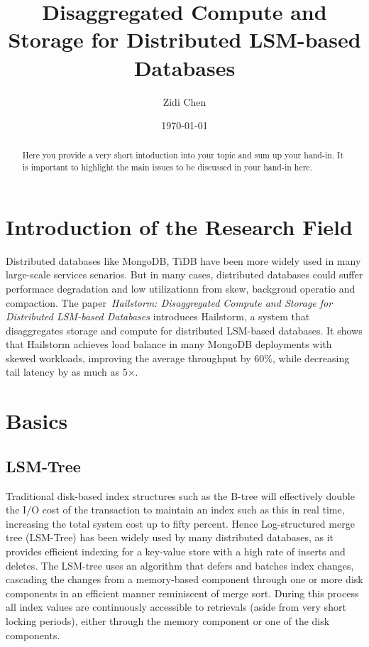 \documentclass[a4paper,10pt,twoside]{article}
\title{Disaggregated Compute and Storage for Distributed LSM-based Databases}
\author{Zidi Chen}
\date{\today}
\begin{document}
\maketitle

\begin{abstract}
Here you provide a very short intoduction into your topic and sum up your hand-in. 
It is important to highlight the main issues to be discussed in your hand-in here.
\end{abstract}

\tableofcontents

\section{Introduction of the Research Field}

Distributed databases like MongoDB, TiDB have been more widely used in many large-scale services senarios.
But in many cases, distributed databases could suffer performace degradation and low utilizationn from skew, backgroud operatio and compaction.
The paper~\textit{Hailstorm: Disaggregated Compute and Storage for Distributed LSM-based Databases} \cite{mainpaper}introduces Hailstorm, a system that disaggregates storage and compute for distributed LSM-based databases.
It shows that Hailstorm achieves load balance in many MongoDB deployments with skewed workloads, improving the average throughput by 60$\%$, while decreasing tail latency by as much as 5×.


\section{Basics}

\subsection{LSM-Tree}

Traditional disk-based index structures such as the B-tree will effectively double the I/O cost of the transaction to maintain an index such as this in real time, increasing the total system cost up to fifty percent. 
Hence Log-structured merge tree (LSM-Tree) has been widely used by many distributed databases, as it provides efficient indexing for a key-value store with a high rate of inserts and deletes.
The LSM-tree uses an algorithm that defers and batches index changes, cascading the changes from a memory-based component through one or more disk components in an efficient manner reminiscent of merge sort. 
During this process all index values are continuously accessible to retrievals (aside from very short locking periods), either through the memory component or one of the disk components.
\end{document}
